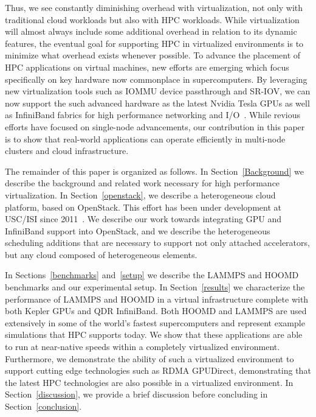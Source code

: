 \documentclass[10pt]{sigplanconf}
\begin{document}
Thus, we see constantly diminishing overhead
with virtualization, not only with traditional cloud workloads
\cite{huber2011evaluating} but also with HPC workloads.  While virtualization
will almost always include some additional overhead in relation to its dynamic
features, the eventual goal for supporting HPC in virtualized environments is to
minimize what overhead exists whenever possible.  To advance the placement of
HPC applications on virtual machines, new efforts are emerging which focus
specifically on key hardware now commonplace in supercomputers. By leveraging
new virtualization tools such as IOMMU device passthrough and SR-IOV, we can now
support the such advanced hardware as the latest Nvidia Tesla GPUs
\cite{Walters2014cloud}  as well as InfiniBand fabrics for high performance networking
and I/O~\cite{jose2013sr,Musleh2014cloud}. While revious efforts have
focused on single-node advancements, our contribution in this paper is to show
that real-world applications can operate efficiently in multi-node clusters and cloud
infrastructure.  





The remainder of this paper is organized as follows.  In
Section~\ref{Background} we describe the background and related work necessary for high performance
virtualization. In Section~\ref{openstack}, we describe a heterogeneous cloud platform, based on OpenStack. This
effort has been under development at USC/ISI since 2011~\cite{crago2011heterogeneous}.
We describe our work towards integrating GPU and InfiniBand support into
OpenStack, and we describe the heterogeneous scheduling additions that are
necessary to support not only attached accelerators, but any cloud composed of
heterogeneous elements.  

In Sections~\ref{benchmarks} and~\ref{setup} we describe the LAMMPS and HOOMD
benchmarks and our experimental setup.  In Section~\ref{results} we characterize the
performance of LAMMPS and HOOMD in a virtual infrastructure complete with both
Kepler GPUs and QDR InfiniBand.  Both HOOMD and LAMMPS are used extensively in
some of the world's fastest supercomputers and represent example simulations
that HPC supports today.  We show that these applications are able to run at
near-native speeds within a completely virtualized environment.
Furthermore, we demonstrate the ability of such a virtualized environment to
support cutting edge technologies such as RDMA GPUDirect, demonstrating that the
latest HPC technologies are also possible in a virtualized environment.
In Section~\ref{discussion}, we provide a brief discussion before concluding in
Section~\ref{conclusion}. 
\end{document}
